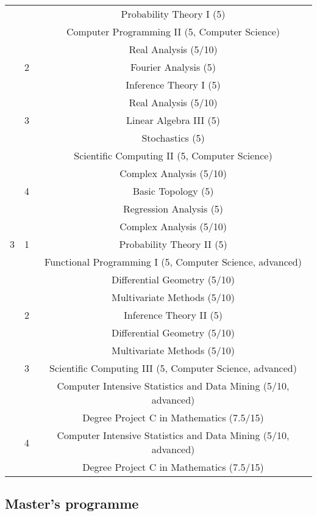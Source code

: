 \documentclass{article}
\begin{document}
\begin{longtable}{|c|c|c|}
      &   & Probability Theory I (5) \\
      &   & Computer Programming II (5, Computer Science) \\
      &   & Real Analysis (5/10) \\
    \hline
      & 2 & Fourier Analysis (5) \\
      &   & Inference Theory I (5) \\
      &   & Real Analysis (5/10) \\
    \hline
      & 3 & Linear Algebra III (5) \\
      &   & Stochastics (5) \\
      &   & Scientific Computing II (5, Computer Science) \\
      &   & Complex Analysis (5/10) \\
    \hline
      & 4 & Basic Topology (5) \\
      &   & Regression Analysis (5) \\
      &   & Complex Analysis (5/10) \\
    \hline
    3 & 1 & Probability Theory II (5) \\
      &   & Functional Programming I (5, Computer Science, advanced) \\
      &   & Differential Geometry (5/10) \\
      &   & Multivariate Methods (5/10) \\
    \hline
      & 2 & Inference Theory II (5) \\
      &   & Differential Geometry (5/10) \\
      &   & Multivariate Methods (5/10) \\
    \hline
      & 3 & Scientific Computing III (5, Computer Science, advanced) \\
      &   & Computer Intensive Statistics and Data Mining (5/10, advanced) \\
      &   & Degree Project C in Mathematics (7.5/15) \\
    \hline
      & 4 & Computer Intensive Statistics and Data Mining (5/10, advanced) \\
      &   & Degree Project C in Mathematics (7.5/15) \\
    \hline
  \end{longtable}

  \subsection{Master's programme}
\end{document}
